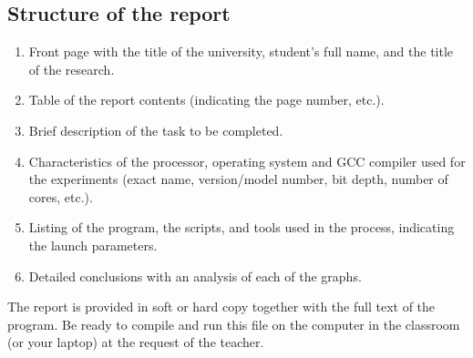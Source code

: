 { %
	\subsection{Structure of the report}
	\begin{enumerate}
		\item Front page with the title of the university, student's full name, and the title of the research.
		\item Table of the report contents (indicating the page number, etc.).
		\item Brief description of the task to be completed.
		\item Characteristics of the processor, operating system and GCC compiler used for the experiments (exact name, version/model number, bit depth, number of cores, etc.).
		\item Listing of the program, the scripts, and tools used in the process, indicating the launch parameters.
		\item Detailed conclusions with an analysis of each of the graphs.
	\end{enumerate}
	\par The report is provided in soft or hard copy together with the full text of the program. Be ready to compile and run this file on the computer in the classroom (or your laptop) at the request of the teacher.
	\par
}